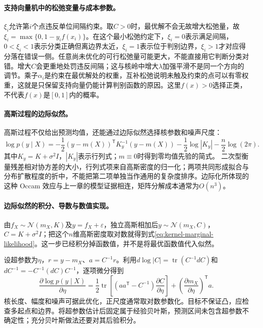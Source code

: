 \paragraph{支持向量机中的松弛变量与成本参数。}
$\xi_i$允许第$i$个点违反单位间隔约束。取$C>0$时，最优解不会无故增大松弛量，故$\xi_i=\max\{0,1-y_if(x_i)\}$。在这个最小松弛约定下，$\xi_i=0$表示满足间隔，$0<\xi_i<1$表示分类正确但离边界太近，$\xi_i=1$表示位于判别边界，$\xi_i>1$才对应得分落在错误一侧。任意尚未优化的可行松弛量可能更大，不能直接用它判断分类对错。增大$C$会更重地处罚违反间隔；这与核岭中增大$\lambda$加强平滑不是同一个方向的调节。乘子$\alpha_i$是约束在最优解处的权重，互补松弛说明未触及约束的点可以有零权重，这就是只保留支持向量仍能计算判别函数的原因。这里$f(x)>0$选择正类，不代表$f(x)$是$[0,1]$内的概率。

\paragraph{高斯过程的边际似然。}
高斯过程不仅给出预测均值，还能通过边际似然选择核参数和噪声尺度：
\begin{equation}
 \log p(y\mid X)=-\frac12(y-m(X))^{\mathsf T}K_y^{-1}(y-m(X))-\frac12\log|K_y|-\frac n2\log(2\pi).\label{eq:kernel-marginal-likelihood}
\end{equation}
其中$K_y=K+\sigma^2I$，$|K_y|$表示行列式；$m\equiv0$时得到零均值先验的简式。
二次型衡量残差相对协方差的大小，行列式项来自高斯密度的归一化；两项共同形成拟合与分布扩散程度的折中，不能把第二项单独当作通用的复杂度排序。边际化所体现的这种 Occam 效应与上一章的模型证据相连，矩阵分解成本通常为$O(n^3)$。

\paragraph{边际似然的积分、导数与数值实现。}
由$f_X\sim\mathcal N(m_X,K)$及$y=f_X+\varepsilon$，独立高斯相加后$y\sim\mathcal N(m_X,C)$，$C=K+\sigma^2I$；把这个$n$维高斯密度取对数就得到式\eqref{eq:kernel-marginal-likelihood}。这一步已经积分掉函数值，并不是将最优函数值代入似然。

设超参数为$\eta$，$r=y-m_X$、$a=C^{-1}r$。利用$d\log|C|=\operatorname{tr}(C^{-1}dC)$和$dC^{-1}=-C^{-1}(dC)C^{-1}$，逐项微分得到
\begin{equation}
 \frac{\partial\log p(y\mid X)}{\partial\eta}
 =\frac12\operatorname{tr}\left[(aa^{\mathsf T}-C^{-1})\frac{\partial C}{\partial\eta}\right]
  +\left(\frac{\partial m_X}{\partial\eta}\right)^{\mathsf T}a.
\end{equation}
核长度、幅度和噪声可据此优化，正尺度通常取对数参数化。目标不保证凸，应检查多起点和边界。将超参数估计后固定属于经验贝叶斯，预测区间未包含超参数不确定性；充分贝叶斯做法还要对其后验积分。

